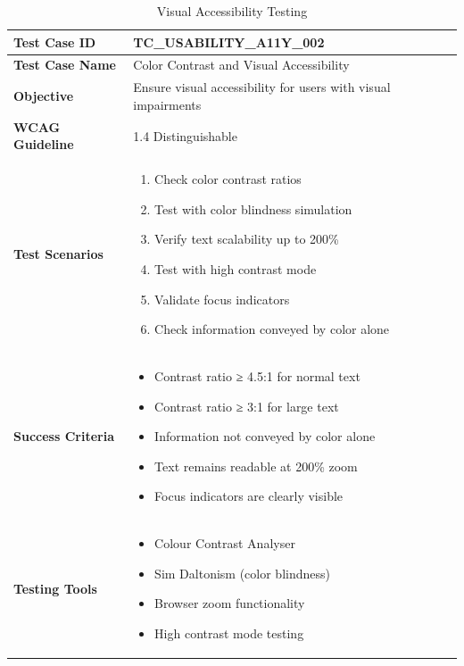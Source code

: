 \documentclass[12pt,a4paper]{article}
\begin{document}
\begin{longtable}{|p{3cm}|p{12cm}|}
\caption{Visual Accessibility Testing} \\
\hline
\rowcolor{lightgray}
\textbf{Test Case ID} & \textbf{TC\_USABILITY\_A11Y\_002} \\
\hline
\textbf{Test Case Name} & Color Contrast and Visual Accessibility \\
\hline
\textbf{Objective} & Ensure visual accessibility for users with visual impairments \\
\hline
\textbf{WCAG Guideline} & 1.4 Distinguishable \\
\hline
\textbf{Test Scenarios} & 
\begin{enumerate}[nosep]
    \item Check color contrast ratios
    \item Test with color blindness simulation
    \item Verify text scalability up to 200\%
    \item Test with high contrast mode
    \item Validate focus indicators
    \item Check information conveyed by color alone
\end{enumerate} \\
\hline
\textbf{Success Criteria} & 
\begin{itemize}[nosep]
    \item Contrast ratio ≥ 4.5:1 for normal text
    \item Contrast ratio ≥ 3:1 for large text
    \item Information not conveyed by color alone
    \item Text remains readable at 200\% zoom
    \item Focus indicators are clearly visible
\end{itemize} \\
\hline
\textbf{Testing Tools} & 
\begin{itemize}[nosep]
    \item Colour Contrast Analyser
    \item Sim Daltonism (color blindness)
    \item Browser zoom functionality
    \item High contrast mode testing
\end{itemize} \\
\hline
\end{longtable}
\end{document}
